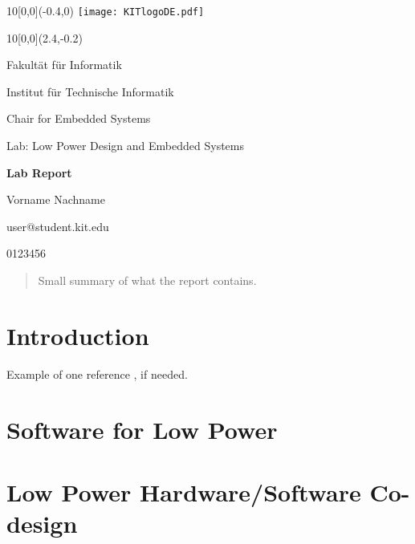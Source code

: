 \documentclass[12pt,a4paper]{article}
\begin{document}
	
\graphicspath{{./}{./fig/}}


\begin{textblock}{10}[0,0](-0.4,0)
	\texttt{[image: KITlogoDE.pdf]}
\end{textblock}

\begin{textblock}{10}[0,0](2.4,-0.2)
	\begin{flushright}
		\large Fakult\"at f\"ur Informatik \par 
		Institut f\"{u}r Technische Informatik \par
		Chair for Embedded Systems
	\end{flushright}
\end{textblock}

\begin{center}
	\vspace{2.5cm}
	{\LARGE \sf Lab: Low Power Design and Embedded Systems}
	\par\vspace{1.0cm}
	{\huge\bf{\textsf{Lab Report}}}
	\par\vspace{1.0cm}
	{\large{Vorname Nachname \par
		user@student.kit.edu \par
		0123456 \par}} %
	\vspace{0.75cm}
\end{center}



\begin{abstract}
Small summary of what the report contains.
\end{abstract}


\section{Introduction}
Example of one reference \cite{legup}, if needed.

\section{Software for Low Power}


\section{Low Power Hardware/Software Co-design}
\end{document}
